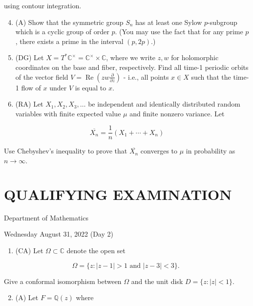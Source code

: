\documentclass[10pt]{article}
\begin{document}
using contour integration.

\begin{enumerate}
  \setcounter{enumi}{3}
  \item (A) Show that the symmetric group $S_{n}$ has at least one Sylow $p$-subgroup which is a cyclic group of order $p$. (You may use the fact that for any prime $p$, there exists a prime in the interval $(p, 2 p)$.)

  \item (DG) Let $X=T^{*} \mathbb{C}^{\times}=\mathbb{C}^{\times} \times \mathbb{C}$, where we write $z, w$ for holomorphic coordinates on the base and fiber, respectively. Find all time-1 periodic orbits of the vector field $V=\operatorname{Re}\left(z w \frac{\partial}{\partial z}\right)$ - i.e., all points $x \in X$ such that the time-1 flow of $x$ under $V$ is equal to $x$.

  \item (RA) Let $X_{1}, X_{2}, X_{3}, \ldots$ be independent and identically distributed random variables with finite expected value $\mu$ and finite nonzero variance. Let

\end{enumerate}

$$
\overline{X_{n}}=\frac{1}{n}\left(X_{1}+\cdots+X_{n}\right)
$$

Use Chebyshev's inequality to prove that $\overline{X_{n}}$ converges to $\mu$ in probability as $n \rightarrow \infty$.

\section*{QUALIFYING EXAMINATION }
Department of Mathematics

Wednesday August 31, 2022 (Day 2)

\begin{enumerate}
  \item (CA) Let $\Omega \subset \mathbb{C}$ denote the open set
\end{enumerate}

$$
\Omega=\{z:|z-1|>1 \text { and }|z-3|<3\} \text {. }
$$

Give a conformal isomorphism between $\Omega$ and the unit disk $D=\{z:|z|<1\}$.

\begin{enumerate}
  \setcounter{enumi}{1}
  \item (A) Let $F=\mathbb{Q}(z)$ where
\end{enumerate}
\end{document}
